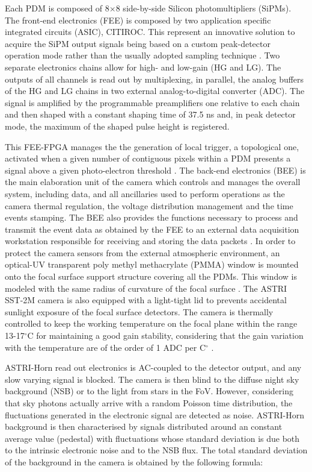 Each PDM is composed of 8$\times$8 side-by-side Silicon photomultipliers (SiPMs). The front-end electronics (FEE) is composed by two application specific integrated circuits (ASIC), CITIROC. This represent an innovative solution to acquire the SiPM output signals  being based on a custom peak-detector operation mode rather than the usually adopted sampling technique \citep{Sottile2016}. 
Two separate electronics chains allow for high- and low-gain (HG and LG). The outputs of all  channels is read out by multiplexing, in parallel, the analog buffers of the HG and LG chains in two external analog-to-digital converter (ADC).
The signal is amplified by the programmable preamplifiers one relative to each chain and then shaped with a constant
shaping time of 37.5 ns and, in peak detector mode, the maximum of the shaped pulse height is registered. 

This FEE-FPGA manages the the generation of local trigger, a topological one, activated when a given number of contiguous pixels within a PDM presents a signal above a given photo-electron threshold \citep{Sottile2016}.
The back-end electronics (BEE) is the main elaboration unit of the camera which controls and manages the overall system, including data, and all ancillaries used to perform operations as
the camera thermal regulation, the voltage distribution management and the time events stamping.
The BEE also provides the functions necessary to process and transmit the event data as obtained by the FEE to an external data acquisition workstation responsible for receiving and storing the data packets \citep{Sottile2016}.
In order to protect the camera sensors from the external
atmospheric environment, an optical-UV transparent poly methyl methacrylate (PMMA)  window 
is mounted onto the focal surface support structure covering all the PDMs.
This window is modeled with the same radius of curvature of the focal surface \citep{Catalano2018}.
The ASTRI SST-2M camera is also equipped  with a light-tight lid to prevents accidental sunlight 
exposure of the focal surface detectors.
The camera is thermally controlled to keep the working temperature on the focal plane within the range 13-17$^\circ$C
for maintaining a good gain stability, considering that the gain variation with the temperature are of the order of 1 ADC per C$^\circ$ \citep{Impiombato2015}.


ASTRI-Horn read out electronics is AC-coupled to the detector output, and any slow varying signal is  blocked.
The camera is then blind to the diffuse night sky background (NSB) or to the light from stars in the FoV.   However, considering that sky photons actually arrive with a random Poisson time distribution, the fluctuations generated in the electronic signal are detected as noise. ASTRI-Horn  background is then characterised by signals distributed around an constant average value (pedestal) with fluctuations whose standard deviation is due both to the intrinsic electronic noise and to the NSB flux.  The total standard deviation of the background in the camera is obtained by the following formula:

